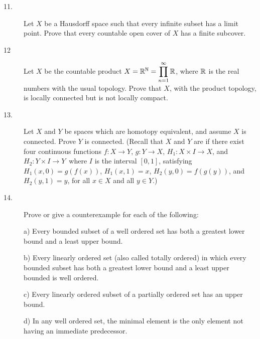 \documentclass[bbb]{report}
\def\ds{\displaystyle}
\def\R{{\Bbb R}}
\def\N{{\Bbb N}}
\begin{document}
\begin{large}
\begin{description}
\item[11.]
Let $X$ be a Hausdorff space such that every infinite subset
has a limit point. Prove that every countable open cover of $X$ has
a finite subcover.

\item[12]
Let $X$ be the countable product $X=\R^\N=\ds\prod^\infty_{n=1}\R$,
where $\R$ is the real numbers with the usual topology.
Prove that $X$, with the product topology, is locally connected but
is not locally compact.

\item[13.]
Let $X$ and $Y$ be spaces which are homotopy equivalent, and assume
$X$ is connected. Prove $Y$ is connected.
(Recall that $X$ and $Y$ are  if there
exist four continuous functions
$f:X\to Y$, $g:Y\to X$, $H_1:X\times I\to X$, and $H_2:Y\times I\to Y$\,
where $I$ is the interval $[0,1]$, satisfying
$H_1(x,0)=g(f(x))$, $H_1(x,1)=x$, $H_2(y,0)=f(g(y))$,
and $H_2(y,1)=y$, for all $x\in X$ and all $y\in Y$.)

\vspace{.15in}
\item[14.]
Prove or give a counterexample for each of the following:

\item[\quad] a)
Every bounded subset of a well ordered set has both a greatest
lower bound and a least upper bound.

\item[\quad] b)
Every linearly ordered set (also called totally ordered) in which
every bounded subset has both a greatest lower bound and a least upper
bounded is well ordered.

\item[\quad] c)
Every linearly ordered subset of a partially ordered set has
an upper bound.

\item[\quad] d)
In any well ordered set, the minimal element is the only element
not having an immediate predecessor.


\end{description}
\end{large}
\end{document}
